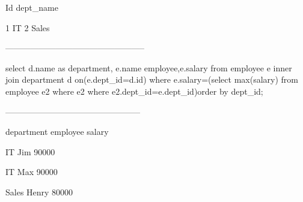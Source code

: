     Id      dept_name
    
     1        IT
     2        Sales	 
	 
	 
--------------------------------------------------


   select d.name as department, e.name employee,e.salary 
   from employee e inner join department d on(e.dept_id=d.id)
   where e.salary=(select max(salary) from employee e2 where
   e2 where e2.dept_id=e.dept_id)order by dept_id;
   
  ------------------------------------------------
  
  department    employee   salary
  
    IT           Jim         90000
	
    IT            Max        90000
	
	Sales         Henry      80000
				
  